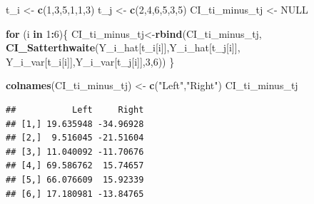 \documentclass[12pt,]{article}
\newenvironment{Shaded}{\begin{snugshade}}{\end{snugshade}}
\newcommand{\KeywordTok}[1]{\textcolor[rgb]{0.13,0.29,0.53}{\textbf{#1}}}
\newcommand{\DecValTok}[1]{\textcolor[rgb]{0.00,0.00,0.81}{#1}}
\newcommand{\StringTok}[1]{\textcolor[rgb]{0.31,0.60,0.02}{#1}}
\newcommand{\OtherTok}[1]{\textcolor[rgb]{0.56,0.35,0.01}{#1}}
\newcommand{\ControlFlowTok}[1]{\textcolor[rgb]{0.13,0.29,0.53}{\textbf{#1}}}
\newcommand{\OperatorTok}[1]{\textcolor[rgb]{0.81,0.36,0.00}{\textbf{#1}}}
\newcommand{\NormalTok}[1]{#1}
\begin{document}
\begin{Shaded}
\begin{Highlighting}[]
\NormalTok{t_i <-}\StringTok{ }\KeywordTok{c}\NormalTok{(}\DecValTok{1}\NormalTok{,}\DecValTok{3}\NormalTok{,}\DecValTok{5}\NormalTok{,}\DecValTok{1}\NormalTok{,}\DecValTok{1}\NormalTok{,}\DecValTok{3}\NormalTok{)}
\NormalTok{t_j <-}\StringTok{ }\KeywordTok{c}\NormalTok{(}\DecValTok{2}\NormalTok{,}\DecValTok{4}\NormalTok{,}\DecValTok{6}\NormalTok{,}\DecValTok{5}\NormalTok{,}\DecValTok{3}\NormalTok{,}\DecValTok{5}\NormalTok{)}
\NormalTok{CI_ti_minus_tj <-}\StringTok{ }\OtherTok{NULL}

\ControlFlowTok{for}\NormalTok{ (i }\ControlFlowTok{in} \DecValTok{1}\OperatorTok{:}\DecValTok{6}\NormalTok{)\{}
\NormalTok{CI_ti_minus_tj<-}\KeywordTok{rbind}\NormalTok{(CI_ti_minus_tj,}
\KeywordTok{CI_Satterthwaite}\NormalTok{(Y_i_hat[t_i[i]],Y_i_hat[t_j[i]],}
\NormalTok{                 Y_i_var[t_i[i]],Y_i_var[t_j[i]],}\DecValTok{3}\NormalTok{,}\DecValTok{6}\NormalTok{)) \}}


\KeywordTok{colnames}\NormalTok{(CI_ti_minus_tj) <-}\StringTok{ }\KeywordTok{c}\NormalTok{(}\StringTok{"Left"}\NormalTok{,}\StringTok{"Right"}\NormalTok{)}
\NormalTok{CI_ti_minus_tj}
\end{Highlighting}
\end{Shaded}

\begin{verbatim}
##           Left     Right
## [1,] 19.635948 -34.96928
## [2,]  9.516045 -21.51604
## [3,] 11.040092 -11.70676
## [4,] 69.586762  15.74657
## [5,] 66.076609  15.92339
## [6,] 17.180981 -13.84765
\end{verbatim}
\end{document}
